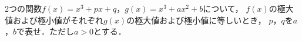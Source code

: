 \documentclass[../../main.tex]{subfiles}
\begin{document}
2つの関数$f(x)=x^3+px+q$，$g(x)=x^3+ax^2+b$について，
$f(x)$の極大値および極小値がそれぞれ$g(x)$の極大値および極小値に等しいとき，
$p$，$q$を$a$，$b$で表せ．ただし$a>0$とする．
\end{document}
